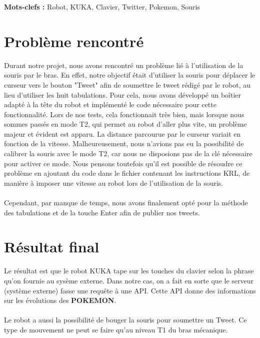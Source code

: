 \documentclass[twoside]{article}
\begin{document}
\textbf{Mots-clefs :} Robot, KUKA, Clavier, Twitter, Pokemon, Souris
\begin{multicols}{2} %




\section{Problème rencontré}

Durant notre projet, nous avons rencontré un problème lié à l'utilisation de la souris par le bras.
En effet, notre objectif était d'utiliser la souris pour déplacer le curseur vers le bouton "Tweet" afin de soumettre le tweet rédigé par le robot, au lieu d'utiliser les huit tabulations.
Pour cela, nous avons développé un boîtier adapté à la tête du robot et implémenté le code nécessaire pour cette fonctionnalité.
Lors de nos tests, cela fonctionnait très bien, mais lorsque nous sommes passés en mode T2, qui permet au robot d'aller plus vite, un problème majeur et évident est apparu.
La distance parcourue par le curseur variait en fonction de la vitesse.
Malheureusement, nous n'avions pas eu la possibilité de calibrer la souris avec le mode T2, car nous ne disposions pas de la clé nécessaire pour activer ce mode.
Nous pensons toutefois qu'il est possible de résoudre ce problème en ajoutant du code dans le fichier contenant les instructions KRL, de manière à imposer une vitesse au robot lors de l'utilisation de la souris.
\\
\\
Cependant, par manque de temps, nous avons finalement opté pour la méthode des
tabulations et de la touche Enter afin de publier nos tweets.

\section{Résultat final}

Le résultat est que le robot KUKA tape sur les touches du clavier selon la phrase qu'on fournie au sysème externe.
Dans notre cas, on a fait en sorte que le serveur (système externe) fasse une requête à une API.
Cette API donne des informations sur les évolutions des \textbf{POKEMON}.
\\
\\
Le robot a aussi la possibilité de bouger la souris pour soumettre un Tweet.
Ce type de mouvement ne peut se faire qu'au niveau T1 du bras mécanique.


\end{multicols}
\end{document}
